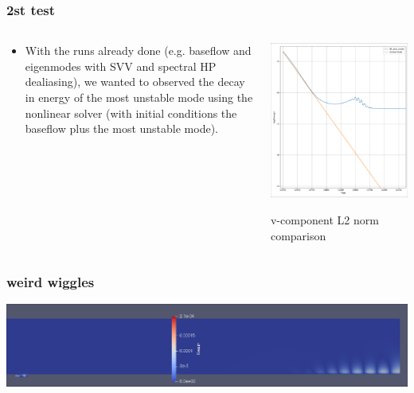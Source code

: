 \documentclass[
	aspectratio=169, %
	t, %
	onlytextwidth, %
	10pt, %
]{beamer}
\begin{document}
\begin{frame}
	\frametitle{2st test}
  \begin{columns}[T] %
	\begin{column}{0.38\linewidth} %
		\begin{itemize}
			\item With the runs already done (e.g. baseflow and eigenmodes with SVV and spectral HP dealiasing), we wanted to observed the decay in energy of the most unstable mode using the nonlinear solver (with initial conditions the baseflow plus the most unstable mode).
		\end{itemize}
	\end{column}
	\begin{column}{0.58\linewidth} %
		{
			\centering
			\includegraphics[width=0.7\linewidth]{Images/plot.png}

			v-component L2 norm comparison
		}
	\end{column}
	\end{columns}

        
\end{frame}
\begin{frame}
	\frametitle{weird wiggles}

	{
	\includegraphics[width=\linewidth]{Images/weirdTS.png}
	}
\end{frame}
\end{document}
